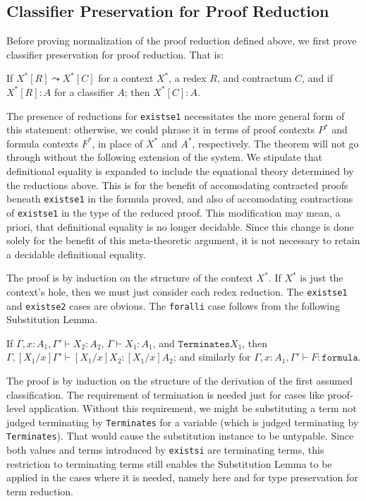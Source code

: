 \documentclass{fundam}
\newcommand{\seq}[3]{#1 \vdash #2 : #3}
\begin{document}
\subsection{Classifier Preservation for Proof Reduction}

Before proving normalization of the proof reduction defined above, we
first prove classifier preservation for proof reduction.  That is:

\begin{theorem}
\label{thm:tp-pres-pf} If
$X^*[R]\leadsto X^*[C]$ for a context $X^*$, a redex $R$, and
contractum $C$, and if $X^*[R] : A$ for a classifier $A$; then $X^*[C]
: A$.
\end{theorem}

\noindent The presence of reductions for \texttt{existse1}
necessitates the more general form of this statement: otherwise, we
could phrase it in terms of proof contexts $P^*$ and formula contexts
$F^*$, in place of $X^*$ and $A^*$, respectively.  The theorem will
not go through without the following extension of the system.  We
stipulate that definitional equality is expanded to include the
equational theory determined by the reductions above.  This is for the
benefit of accomodating contracted proofs beneath \texttt{existse1} in
the formula proved, and also of accomodating contractions of
\texttt{existse1} in the type of the reduced proof.  This modification
may mean, a priori, that definitional equality is no longer decidable.
Since this change is done solely for the benefit of this
meta-theoretic argument, it is not necessary to retain a decidable
definitional equality.

The proof is by induction on the structure of the context $X^*$.  If
$X^*$ is just the context's hole, then we must just consider each
redex reduction.  The \texttt{existse1} and \texttt{existse2} cases
are obvious.  The \texttt{foralli} case follows from the following
Substitution Lemma.

\begin{lemma}[Substitution]
If $\seq{\Gamma,x:A_1,\Gamma'}{X_2}{A_2}$, $\seq{\Gamma}{X_1}{A_1}$,
and $\texttt{Terminates} X_1$, then
$\seq{\Gamma,[X_1/x]\Gamma'}{[X_1/x]X_2}{[X_1/x]A_2}$; and similarly
for $\seq{\Gamma,x:A_1,\Gamma'}{F}{\texttt{formula}}$.
\end{lemma}

The proof is by induction on the structure of the derivation of the
first assumed classification.  The requirement of termination is
needed just for cases like proof-level application.  Without this
requirement, we might be substituting a term not judged terminating by
\texttt{Terminates} for a variable (which is judged terminating by
\texttt{Terminates}).  That would cause the substitution instance to
be untypable.  Since both values and terms introduced by
\texttt{existsi} are terminating terms, this restriction to
terminating terms still enables the Substitution Lemma to be applied
in the cases where it is needed, namely here and for type preservation
for term reduction.
\end{document}
